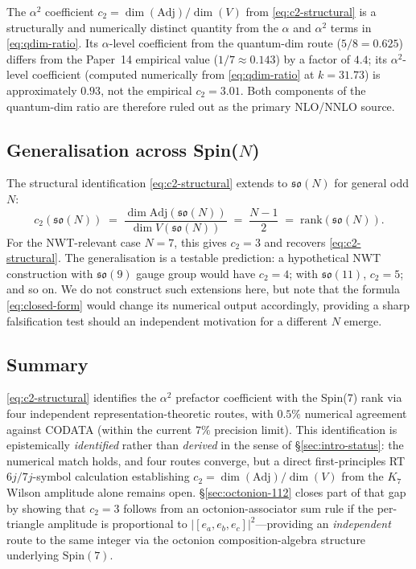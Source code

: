 \documentclass[11pt]{article}
\newcommand{\so}{\mathfrak{so}}
\newcommand{\Spin}{\mathrm{Spin}}
\newcommand{\Adj}{\mathrm{Adj}}
\begin{document}
The $\alpha^2$ coefficient $c_2 = \dim(\Adj)/\dim(V)$ from
\eqref{eq:c2-structural} is a structurally and numerically distinct
quantity from the $\alpha$ and $\alpha^2$ terms in
\eqref{eq:qdim-ratio}.  Its $\alpha$-level coefficient from the
quantum-dim route ($5/8 = 0.625$) differs from the Paper~14
empirical value ($1/7 \approx 0.143$) by a factor of $4.4$; its
$\alpha^2$-level coefficient (computed numerically from
\eqref{eq:qdim-ratio} at $k = 31.73$) is approximately $0.93$, not
the empirical $c_2 = 3.01$.  Both components of the quantum-dim
ratio are therefore ruled out as the primary NLO/NNLO source.

\subsection{Generalisation across Spin($N$)}
\label{sec:alpha-squared-general-N}

The structural identification \eqref{eq:c2-structural} extends to
$\so(N)$ for general odd $N$:
\begin{equation}
  c_2(\so(N)) \;=\; \frac{\dim \Adj(\so(N))}{\dim V(\so(N))}
                 \;=\; \frac{N-1}{2}
                 \;=\; \mathrm{rank}(\so(N)).
\end{equation}
For the NWT-relevant case $N = 7$, this gives $c_2 = 3$ and
recovers \eqref{eq:c2-structural}.  The generalisation is a
testable prediction: a hypothetical NWT construction with
$\so(9)$ gauge group would have $c_2 = 4$; with $\so(11)$,
$c_2 = 5$; and so on.  We do not construct such extensions here,
but note that the formula \eqref{eq:closed-form} would change
its numerical output accordingly, providing a sharp
falsification test should an independent motivation for a
different $N$ emerge.

\subsection{Summary}
\label{sec:alpha-squared-summary}

\eqref{eq:c2-structural} identifies the $\alpha^2$ prefactor
coefficient with the Spin(7) rank via four independent
representation-theoretic routes, with $0.5\%$ numerical agreement
against CODATA (within the current $7\%$ precision limit).  This
identification is epistemically \emph{identified} rather than
\emph{derived} in the sense of \S\ref{sec:intro-status}: the
numerical match holds, and four routes converge, but a direct
first-principles RT $6j/7j$-symbol calculation establishing
$c_2 = \dim(\Adj)/\dim(V)$ from the $K_7$ Wilson amplitude alone
remains open.  \S\ref{sec:octonion-112} closes part of that gap
by showing that $c_2 = 3$ follows from an octonion-associator
sum rule if the per-triangle amplitude is proportional to
$|[e_a, e_b, e_c]|^2$---providing an \emph{independent} route to
the same integer via the octonion composition-algebra structure
underlying $\Spin(7)$.
\end{document}
